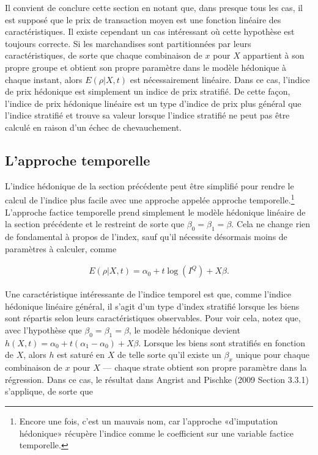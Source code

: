\documentclass[]{article}
\begin{document}
Il convient de conclure cette section en notant que, dans presque tous les cas, il est supposé que le prix de transaction moyen est une fonction linéaire des caractéristiques. Il existe cependant un cas intéressant où cette hypothèse est toujours correcte. Si les marchandises sont partitionnées par leurs caractéristiques, de sorte que chaque combinaison de \(x\) pour \(X\) appartient à son propre groupe et obtient son propre paramètre dans le modèle hédonique à chaque instant, alors \(E(\rho | X, t)\) est nécessairement linéaire. Dans ce cas, l'indice de prix hédonique est simplement un indice de prix stratifié. De cette façon, l'indice de prix hédonique linéaire est un type d'indice de prix plus général que l'indice stratifié et trouve sa valeur lorsque l'indice stratifié ne peut pas être calculé en raison d'un échec de chevauchement.

\hypertarget{lapproche-temporelle}{%
\subsection{L'approche temporelle}\label{lapproche-temporelle}}

L'indice hédonique de la section précédente peut être simplifié pour rendre le calcul de l'indice plus facile avec une approche appelée approche temporelle.\footnote{Encore une fois, c'est un mauvais nom, car l'approche «d'imputation hédonique» récupère l'indice comme le coefficient sur une variable factice temporelle.} L'approche factice temporelle prend simplement le modèle hédonique linéaire de la section précédente et le restreint de sorte que \(\beta_{0} = \beta_{1} = \beta\). Cela ne change rien de fondamental à propos de l'index, sauf qu'il nécessite désormais moins de paramètres à calculer, comme

\begin{align*}
E(\rho | X, t) = \alpha_{0} + t \log(I^{Q}) + X \beta.
\end{align*}

Une caractéristique intéressante de l'indice temporel est que, comme l'indice hédonique linéaire général, il s'agit d'un type d'index stratifié lorsque les biens sont répartis selon leurs caractéristiques observables. Pour voir cela, notez que, avec l'hypothèse que \(\beta_{0} = \beta_{1} = \beta\), le modèle hédonique devient \(h(X, t) = \alpha_{0} + t (\alpha_{1} - \alpha_{0}) + X \beta\). Lorsque les biens sont stratifiés en fonction de \(X\), alors \(h\) est saturé en \(X\) de telle sorte qu'il existe un \(\beta_x\) unique pour chaque combinaison de \(x\) pour \(X\) --- chaque strate obtient son propre paramètre dans la régression. Dans ce cas, le résultat dans Angrist and Pischke (2009 Section 3.3.1) s'applique, de sorte que
\end{document}
